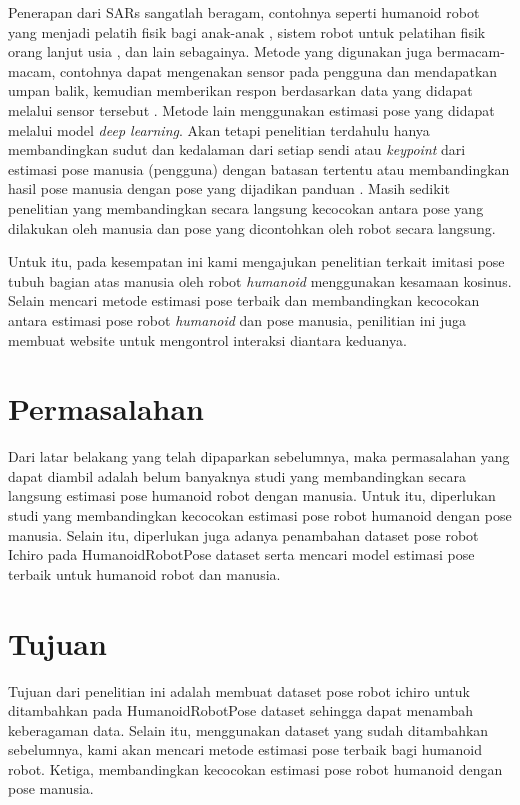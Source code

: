 Penerapan dari SARs sangatlah beragam, contohnya seperti humanoid robot yang menjadi pelatih fisik bagi anak-anak \parencite{güneysu2017},
sistem robot untuk pelatihan fisik orang lanjut usia \parencite{avioz2021}, dan lain sebagainya. Metode yang digunakan juga bermacam-macam,
contohnya dapat mengenakan sensor pada pengguna dan mendapatkan umpan balik, kemudian memberikan respon berdasarkan data yang didapat melalui sensor tersebut \parencite{güneysu2017}.
Metode lain menggunakan estimasi pose yang didapat melalui model \emph{deep learning}.
Akan tetapi penelitian terdahulu hanya membandingkan sudut dan kedalaman dari setiap sendi atau \emph{keypoint} dari estimasi pose manusia (pengguna) dengan batasan tertentu atau membandingkan hasil pose manusia dengan pose yang dijadikan panduan \parencite{romeo}.
Masih sedikit penelitian yang membandingkan secara langsung kecocokan antara pose yang dilakukan oleh manusia dan pose yang dicontohkan oleh robot secara langsung.

Untuk itu, pada kesempatan ini kami mengajukan penelitian terkait imitasi pose tubuh bagian atas manusia oleh robot \emph{humanoid} menggunakan kesamaan kosinus.
Selain mencari metode estimasi pose terbaik dan membandingkan kecocokan antara estimasi pose robot \emph{humanoid} dan pose manusia, penilitian ini juga membuat website untuk mengontrol interaksi diantara keduanya.

\section{Permasalahan}
\label{sec:permasalahan}

Dari latar belakang yang telah dipaparkan sebelumnya, maka permasalahan yang dapat
diambil adalah belum banyaknya studi yang membandingkan secara langsung estimasi pose
humanoid robot dengan manusia. Untuk itu, diperlukan studi yang membandingkan kecocokan
estimasi pose robot humanoid dengan pose manusia. Selain itu, diperlukan juga adanya penambahan dataset pose robot Ichiro pada HumanoidRobotPose dataset serta mencari model estimasi
pose terbaik untuk humanoid robot dan manusia.

\section{Tujuan}
\label{sec:tujuan}

Tujuan dari penelitian ini adalah membuat dataset pose robot ichiro untuk ditambahkan
pada HumanoidRobotPose dataset sehingga dapat menambah keberagaman data. Selain itu,
menggunakan dataset yang sudah ditambahkan sebelumnya, kami akan mencari metode estimasi pose terbaik bagi humanoid robot. Ketiga, membandingkan kecocokan estimasi pose
robot humanoid dengan pose manusia.

